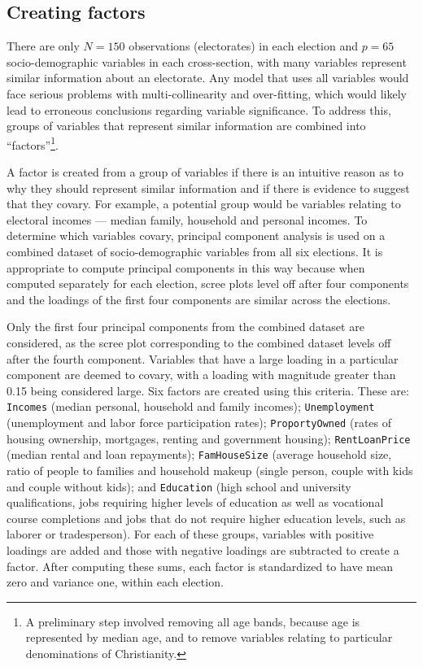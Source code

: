 \documentclass[times, doublespace]{anzsauth}
\let\rmarkdownfootnote\footnote%
\def\footnote{\protect\rmarkdownfootnote}
\begin{document}
\hypertarget{creating-factors}{%
\subsection{Creating factors}\label{creating-factors}}

There are only \(N = 150\) observations (electorates) in each election and \(p = 65\) socio-demographic variables in each cross-section, with many variables represent similar information about an electorate. Any model that uses all variables would face serious problems with multi-collinearity and over-fitting, which would likely lead to erroneous conclusions regarding variable significance. To address this, groups of variables that represent similar information are combined into ``factors''\footnote{A preliminary step involved removing all age bands, because age is represented by median age, and to remove variables relating to particular denominations of Christianity.}.

A factor is created from a group of variables if there is an intuitive reason as to why they should represent similar information and if there is evidence to suggest that they covary. For example, a potential group would be variables relating to electoral incomes --- median family, household and personal incomes. To determine which variables covary, principal component analysis is used on a combined dataset of socio-demographic variables from all six elections. It is appropriate to compute principal components in this way because when computed separately for each election, scree plots level off after four components and the loadings of the first four components are similar across the elections.

Only the first four principal components from the combined dataset are considered, as the scree plot corresponding to the combined dataset levels off after the fourth component. Variables that have a large loading in a particular component are deemed to covary, with a loading with magnitude greater than 0.15 being considered large. Six factors are created using this criteria. These are:
\texttt{Incomes} (median personal, household and family incomes);
\texttt{Unemployment} (unemployment and labor force participation rates);
\texttt{ProportyOwned} (rates of housing ownership, mortgages, renting and government housing);
\texttt{RentLoanPrice} (median rental and loan repayments);
\texttt{FamHouseSize} (average household size, ratio of people to families and household makeup (single person, couple with kids and couple without kids); and
\texttt{Education} (high school and university qualifications, jobs requiring higher levels of education as well as vocational course completions and jobs that do not require higher education levels, such as laborer or tradesperson).
For each of these groups, variables with positive loadings are added and those with negative loadings are subtracted to create a factor. After computing these sums, each factor is standardized to have mean zero and variance one, within each election.
\end{document}
